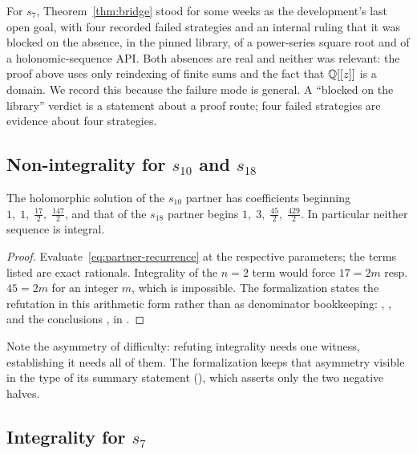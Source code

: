 \begin{remark}\label{rem:blocked}
For $s_7$, Theorem~\ref{thm:bridge} stood for some weeks as the development's
last open goal, with four recorded failed strategies and an internal ruling
that it was blocked on the absence, in the pinned library, of a power-series
square root and of a holonomic-sequence API. Both absences are real and neither
was relevant: the proof above uses only reindexing of finite sums and the fact
that $\mathbb{Q}[[z]]$ is a domain. We record this because the failure mode is general.
A ``blocked on the library'' verdict is a statement about a proof route; four
failed strategies are evidence about four strategies.
\end{remark}

\subsection{Non-integrality for \texorpdfstring{$s_{10}$}{s10} and
\texorpdfstring{$s_{18}$}{s18}}

\begin{theorem}[status (K)]\label{thm:non-integral}
The holomorphic solution of the $s_{10}$ partner has coefficients beginning
$1,\;1,\;\tfrac{17}{2},\;\tfrac{147}{2}$, and that of the $s_{18}$ partner
begins $1,\;3,\;\tfrac{45}{2},\;\tfrac{429}{2}$. In particular neither
sequence is integral.
\end{theorem}

\begin{proof}
Evaluate~\eqref{eq:partner-recurrence} at the respective parameters; the terms
listed are exact rationals. Integrality of the $n=2$ term would force
$17 = 2m$ resp. $45 = 2m$ for an integer $m$, which is impossible. The
formalization states the refutation in this arithmetic form rather than as
denominator bookkeeping: ,
, and the conclusions
, 
in .
\end{proof}

Note the asymmetry of difficulty: refuting integrality needs one witness,
establishing it needs all of them. The formalization keeps that asymmetry
visible in the type of its summary statement
(), which asserts only the two negative
halves.

\subsection{Integrality for \texorpdfstring{$s_7$}{s7}}

